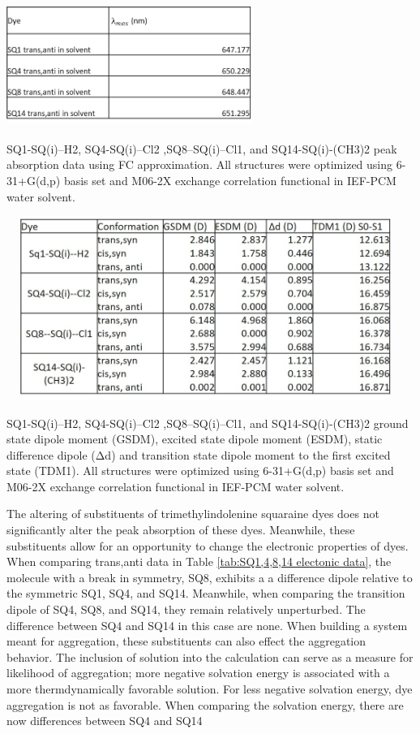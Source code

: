 \documentclass[journal=jacsat,manuscript=article]{achemso}
\begin{document}
\newpage
\begin{table}[h]
    \centering
    \includegraphics[width=8cm,height=4cm]{figures/sq1_4_8_14-table.png}
    \caption{SQ1-SQ(i)--H2, SQ4-SQ(i)--Cl2 ,SQ8--SQ(i)--Cl1, and SQ14-SQ(i)-(CH3)2 peak absorption data using FC approximation. All structures were optimized using 6-31+G(d,p) basis set and M06-2X exchange correlation functional in IEF-PCM water solvent.}
    \label{tab:SQ1,4,8,14 lambda data}
\end{table}
\begin{table}[h]
    \centering
    \includegraphics[width=13cm,height=6cm]{figures/SQ1_4_8_14_electronic_table.jpg}
        \caption{SQ1-SQ(i)--H2, SQ4-SQ(i)--Cl2 ,SQ8--SQ(i)--Cl1, and SQ14-SQ(i)-(CH3)2 ground state dipole moment (GSDM), excited state dipole moment (ESDM), static difference dipole (Δd) and transition state dipole moment to the first excited state (TDM1). All structures were optimized using 6-31+G(d,p) basis set and M06-2X exchange correlation functional in IEF-PCM water solvent.}
    \label{tab:SQ1,4,8,14 electonic data}
\end{table}
\newpage
The altering of substituents of trimethylindolenine squaraine dyes does not significantly alter the peak absorption of these dyes. Meanwhile, these substituents allow for an opportunity to change the electronic properties of dyes. When comparing trans,anti data in Table \ref{tab:SQ1,4,8,14 electonic data}, the molecule with a break in symmetry, SQ8, exhibits a a difference dipole relative to the symmetric SQ1, SQ4, and SQ14. Meanwhile, when comparing the transition dipole of SQ4, SQ8, and SQ14, they remain relatively unperturbed. The difference between SQ4 and SQ14 in this case are none. When building a system meant for aggregation, these substituents can also effect the aggregation behavior. The inclusion of solution into the calculation can serve as a measure for likelihood of aggregation; more negative solvation energy is associated with a more thermdynamically favorable solution. For less negative solvation energy, dye aggregation is not as favorable. When comparing the solvation energy, there are now differences between SQ4 and SQ14 
\newpage
\newpage
\end{document}
